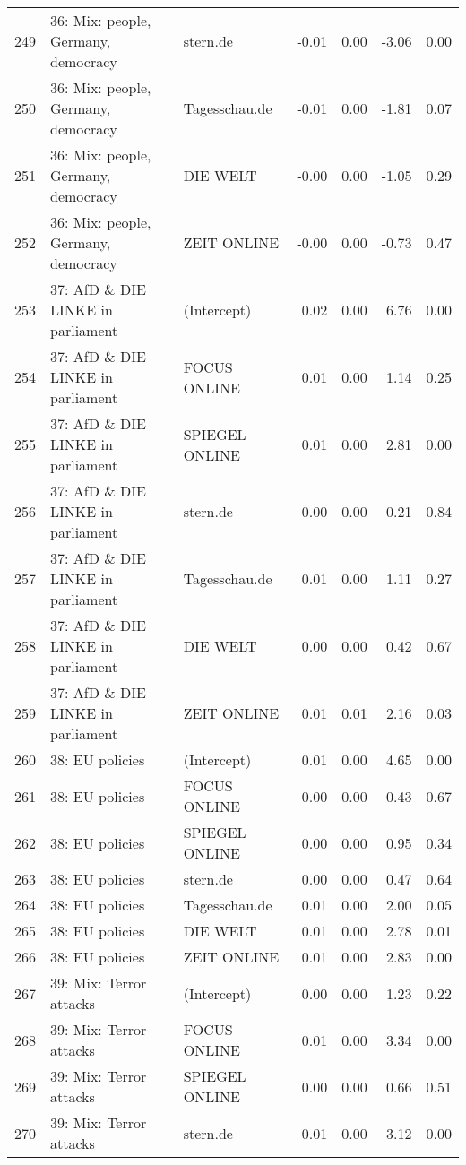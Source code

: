 \begin{table}[ht]
{\begin{tabular}{rllrrrr}
  249 & 36: Mix: people, Germany, democracy & stern.de & -0.01 & 0.00 & -3.06 & 0.00 \\ 
  250 & 36: Mix: people, Germany, democracy & Tagesschau.de & -0.01 & 0.00 & -1.81 & 0.07 \\ 
  251 & 36: Mix: people, Germany, democracy & DIE WELT & -0.00 & 0.00 & -1.05 & 0.29 \\ 
  252 & 36: Mix: people, Germany, democracy & ZEIT ONLINE & -0.00 & 0.00 & -0.73 & 0.47 \\ 
  253 & 37: AfD \& DIE LINKE in parliament & (Intercept) & 0.02 & 0.00 & 6.76 & 0.00 \\ 
  254 & 37: AfD \& DIE LINKE in parliament & FOCUS ONLINE & 0.01 & 0.00 & 1.14 & 0.25 \\ 
  255 & 37: AfD \& DIE LINKE in parliament & SPIEGEL ONLINE & 0.01 & 0.00 & 2.81 & 0.00 \\ 
  256 & 37: AfD \& DIE LINKE in parliament & stern.de & 0.00 & 0.00 & 0.21 & 0.84 \\ 
  257 & 37: AfD \& DIE LINKE in parliament & Tagesschau.de & 0.01 & 0.00 & 1.11 & 0.27 \\ 
  258 & 37: AfD \& DIE LINKE in parliament & DIE WELT & 0.00 & 0.00 & 0.42 & 0.67 \\ 
  259 & 37: AfD \& DIE LINKE in parliament & ZEIT ONLINE & 0.01 & 0.01 & 2.16 & 0.03 \\ 
  260 & 38: EU policies & (Intercept) & 0.01 & 0.00 & 4.65 & 0.00 \\ 
  261 & 38: EU policies & FOCUS ONLINE & 0.00 & 0.00 & 0.43 & 0.67 \\ 
  262 & 38: EU policies & SPIEGEL ONLINE & 0.00 & 0.00 & 0.95 & 0.34 \\ 
  263 & 38: EU policies & stern.de & 0.00 & 0.00 & 0.47 & 0.64 \\ 
  264 & 38: EU policies & Tagesschau.de & 0.01 & 0.00 & 2.00 & 0.05 \\ 
  265 & 38: EU policies & DIE WELT & 0.01 & 0.00 & 2.78 & 0.01 \\ 
  266 & 38: EU policies & ZEIT ONLINE & 0.01 & 0.00 & 2.83 & 0.00 \\ 
  267 & 39: Mix: Terror attacks & (Intercept) & 0.00 & 0.00 & 1.23 & 0.22 \\ 
  268 & 39: Mix: Terror attacks & FOCUS ONLINE & 0.01 & 0.00 & 3.34 & 0.00 \\ 
  269 & 39: Mix: Terror attacks & SPIEGEL ONLINE & 0.00 & 0.00 & 0.66 & 0.51 \\ 
  270 & 39: Mix: Terror attacks & stern.de & 0.01 & 0.00 & 3.12 & 0.00 \\ 

\end{tabular}}
\end{table}
